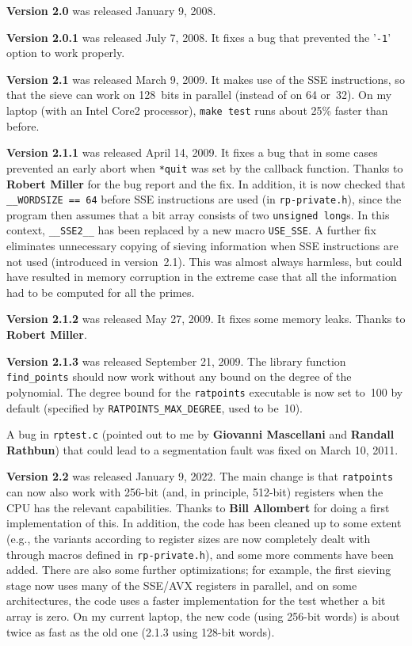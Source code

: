 \documentclass[12pt,a4paper,oneside]{amsart}
\begin{document}
\textbf{Version 2.0} was released January 9, 2008.

\textbf{Version 2.0.1} was released July 7, 2008. It fixes a bug that prevented the
'\texttt{-1}' option to work properly.

\textbf{Version 2.1} was released March 9, 2009. It makes use of the SSE instructions,
so that the sieve can work on 128~bits in parallel (instead of on 64 or~32).
On my laptop (with an Intel Core2 processor), \texttt{make test} runs about
25\% faster than before.

\textbf{Version 2.1.1} was released April 14, 2009. It fixes a bug that in some
cases prevented an early abort when \texttt{*quit} was set by the callback function.
Thanks to \textbf{Robert Miller} for the bug report and the fix. In addition, it is now
checked that \verb+__WORDSIZE == 64+ before SSE instructions are used
(in \texttt{rp-private.h}), since the program then assumes that a bit array consists
of two \texttt{unsigned long}s. In this context, \verb+__SSE2__+ has been replaced
by a new macro \verb+USE_SSE+. A further fix eliminates unnecessary copying
of sieving information when SSE instructions are not used (introduced in version~2.1).
This was almost always harmless, but could have resulted in memory corruption
in the extreme case that all the information had to be computed for all the
primes.

\textbf{Version 2.1.2} was released May 27, 2009. It fixes some memory leaks.
Thanks to \textbf{Robert Miller}.

\textbf{Version 2.1.3} was released September 21, 2009. The library function
\verb+find_points+ should now work without any bound on the degree of the
polynomial. The degree bound for the \texttt{ratpoints} executable is now set
to~100 by default (specified by \verb+RATPOINTS_MAX_DEGREE+, used to be~10).

A bug in \texttt{rptest.c} (pointed out to me by \textbf{Giovanni Mascellani}
and \textbf{Randall Rathbun}) that could lead to a segmentation fault was fixed on
March 10, 2011.

\textbf{Version 2.2} was released January 9, 2022. The main change is that
\texttt{ratpoints} can now also work with 256-bit (and, in principle, 512-bit)
registers when the CPU has the relevant capabilities. Thanks to
\textbf{Bill Allombert} for doing a first implementation of this. In addition,
the code has been cleaned up to some extent (e.g., the variants according
to register sizes are now completely dealt with through macros defined
in \texttt{rp-private.h}), and some more comments have been added.
There are also some further optimizations; for example, the first sieving
stage now uses many of the SSE/AVX registers in parallel, and on some
architectures, the code uses a faster implementation for the test whether
a bit array is zero. On my current laptop, the new code (using 256-bit words)
is about twice as fast as the old one (2.1.3 using 128-bit words).
\end{document}
